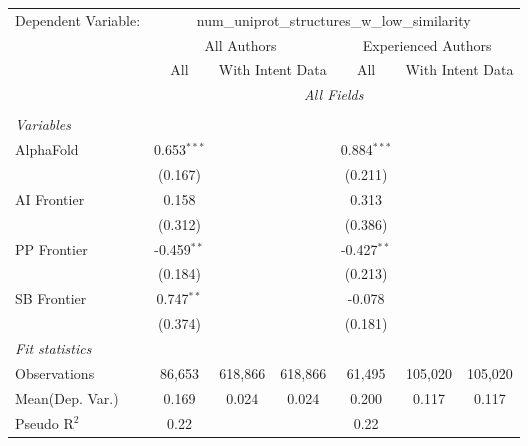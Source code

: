 \begingroup
\centering
\begin{tabular}{lcccccc}
   \tabularnewline \midrule \midrule
   Dependent Variable: & \multicolumn{6}{c}{num\_uniprot\_structures\_w\_low\_similarity}\\
 & \multicolumn{3}{c}{All Authors} & \multicolumn{3}{c}{Experienced Authors} \\
\cmidrule(lr){2-4} \cmidrule(lr){5-7}
 & \multicolumn{1}{c}{All} & \multicolumn{2}{c}{With Intent Data} & \multicolumn{1}{c}{All} & \multicolumn{2}{c}{With Intent Data} \\
\cmidrule(lr){2-2} \cmidrule(lr){3-4} \cmidrule(lr){5-5} \cmidrule(lr){6-7}
 & \multicolumn{6}{c}{\textit{All Fields}} \\ \\
   \emph{Variables}\\
   AlphaFold    & 0.653$^{***}$ &         &         & 0.884$^{***}$ &         &   \\   
                & (0.167)       &         &         & (0.211)       &         &   \\   
   AI Frontier  & 0.158         &         &         & 0.313         &         &   \\   
                & (0.312)       &         &         & (0.386)       &         &   \\   
   PP Frontier  & -0.459$^{**}$ &         &         & -0.427$^{**}$ &         &   \\   
                & (0.184)       &         &         & (0.213)       &         &   \\   
   SB Frontier  & 0.747$^{**}$  &         &         & -0.078        &         &   \\   
                & (0.374)       &         &         & (0.181)       &         &   \\   
   \midrule
   \emph{Fit statistics}\\
   Observations & 86,653        & 618,866 & 618,866 & 61,495        & 105,020 & 105,020\\  
Mean(Dep. Var.) & 0.169 & 0.024 & 0.024 & 0.200 & 0.117 & 0.117 \\
   Pseudo R$^2$ & 0.22          &         &         & 0.22          &         & \\  
   

\end{tabular}
